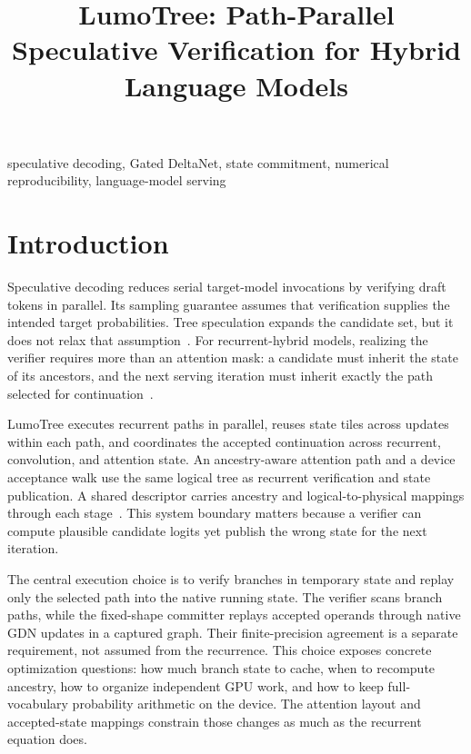 \documentclass[conference]{IEEEtran}
\newcommand{\sys}{LumoTree}
\begin{document}
\title{LumoTree: Path-Parallel Speculative Verification for Hybrid Language Models}
\author{
}
\maketitle

\begin{IEEEkeywords}
speculative decoding, Gated DeltaNet, state commitment, numerical reproducibility, language-model serving
\end{IEEEkeywords}

\section{Introduction}
Speculative decoding reduces serial target-model invocations by verifying draft tokens in parallel. Its sampling guarantee assumes that verification supplies the intended target probabilities. Tree speculation expands the candidate set, but it does not relax that assumption~\cite{leviathan2023fast,chen2023sampling,miao2023specinfer}. For recurrent-hybrid models, realizing the verifier requires more than an attention mask: a candidate must inherit the state of its ancestors, and the next serving iteration must inherit exactly the path selected for continuation~\cite{yang2024gated,wu2025stree}.

\sys{} executes recurrent paths in parallel, reuses state tiles across updates within each path, and coordinates the accepted continuation across recurrent, convolution, and attention state. An ancestry-aware attention path and a device acceptance walk use the same logical tree as recurrent verification and state publication. A shared descriptor carries ancestry and logical-to-physical mappings through each stage~\cite{lumo2026archive,lumo2026stateless}. This system boundary matters because a verifier can compute plausible candidate logits yet publish the wrong state for the next iteration.

The central execution choice is to verify branches in temporary state and replay only the selected path into the native running state. The verifier scans branch paths, while the fixed-shape committer replays accepted operands through native GDN updates in a captured graph. Their finite-precision agreement is a separate requirement, not assumed from the recurrence. This choice exposes concrete optimization questions: how much branch state to cache, when to recompute ancestry, how to organize independent GPU work, and how to keep full-vocabulary probability arithmetic on the device. The attention layout and accepted-state mappings constrain those changes as much as the recurrent equation does.
\end{document}
